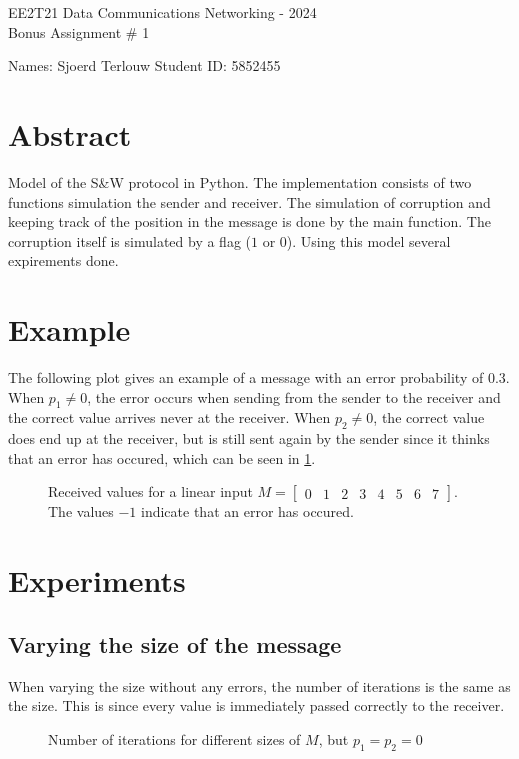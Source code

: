 \documentclass[11pt,fleqn]{article}
\begin{document}
	\begin{center}
		{\Large EE2T21 Data Communications Networking - 2024\\[0.1em]
			Bonus Assignment \# 1 \\}
	\end{center}

    \parbox[l][17mm][t]{\textwidth}{Names: Sjoerd Terlouw \hspace{6.66cm}
			Student ID: 5852455}
	\section{Abstract}
    Model of the S\&W protocol in Python. The implementation consists of two functions simulation the sender and receiver. The simulation of corruption and keeping track of the position in the message is done by the main function. The corruption itself is simulated by a flag ($1$ or $0$). 
    Using this model several expirements done.

    \section{Example}
    The following plot gives an example of a message with an error probability of $0.3$. When $p_1 \neq 0$, the error occurs when sending from the sender to the receiver and the correct value arrives never at the receiver. When $p_2 \neq 0$, the correct value does end up at the receiver, but is still sent again by the sender since it thinks that an error has occured, which can be seen in \ref{fig:example}.
    \begin{figure}[H]
        \centering
        
        \caption{Received values for a linear input $M=\begin{bmatrix} 0 & 1 & 2 & 3 & 4 & 5 & 6 & 7 \end{bmatrix}$. The values $-1$ indicate that an error has occured.}
        \label{fig:example}
    \end{figure}

    \section{Experiments}
    \subsection{Varying the size of the message}
    When varying the size without any errors, the number of iterations is the same as the size. This is since every value is immediately passed correctly to the receiver.
    \begin{figure}[H]
        \centering
        
        \caption{Number of iterations for different sizes of $M$, but $p_1=p_2=0$}
        \label{fig:size_experiment}
    \end{figure}
\end{document}
